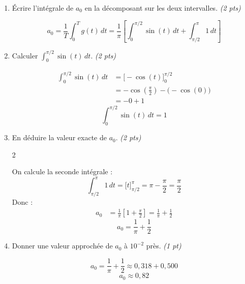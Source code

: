 \documentclass[a4paper,11pt]{article}
\begin{document}
\begin{enumerate}[label=\textbf{\arabic*.}]
  \item Écrire l'intégrale de $a_0$ en la décomposant sur les deux intervalles. \hfill \textit{(2 pts)}
  \begin{tcolorbox}[corrigebox]
    \[
      a_0 = \frac{1}{T}\int_0^T g(t)\,dt = \frac{1}{\pi}\left[\int_0^{\pi/2} \sin(t)\,dt + \int_{\pi/2}^{\pi} 1\,dt\right]
    \]
  \end{tcolorbox}

  \item Calculer $\displaystyle\int_0^{\pi/2} \sin(t)\,dt$. \hfill \textit{(2 pts)}
  \begin{tcolorbox}[corrigebox]
    \begin{align*}
      \int_0^{\pi/2} \sin(t)\,dt &= \Big[-\cos(t)\Big]_0^{\pi/2} \\
          &= -\cos\!\left(\frac{\pi}{2}\right) - \bigl(-\cos(0)\bigr) \\
          &= -0 + 1
    \end{align*}
    \[\boxed{\int_0^{\pi/2} \sin(t)\,dt = 1}\]
  \end{tcolorbox}

  \item En déduire la valeur exacte de $a_0$. \hfill \textit{(2 pts)}
  \begin{tcolorbox}[corrigebox]
  	\begin{multicols}{2}
  
    On calcule la seconde intégrale :
    \[
      \int_{\pi/2}^{\pi} 1\,dt = \Big[t\Big]_{\pi/2}^{\pi} = \pi - \frac{\pi}{2} = \frac{\pi}{2}
    \]
    Donc :
    \begin{align*}
      a_0 &= \frac{1}{\pi}\left[1 + \frac{\pi}{2}\right] = \frac{1}{\pi} + \frac{1}{2}
    \end{align*}
    \[\boxed{a_0 = \frac{1}{\pi} + \frac{1}{2}}\]
    	\end{multicols}
  \end{tcolorbox}

  \item Donner une valeur approchée de $a_0$ à $10^{-2}$ près. \hfill \textit{(1 pt)}
  \begin{tcolorbox}[corrigebox]
    \[
      a_0 = \frac{1}{\pi} + \frac{1}{2} \approx 0{,}318 + 0{,}500
    \]
    \[\boxed{a_0 \approx 0{,}82}\]
  \end{tcolorbox}
\end{enumerate}

\vspace{0.5cm}
\end{document}
